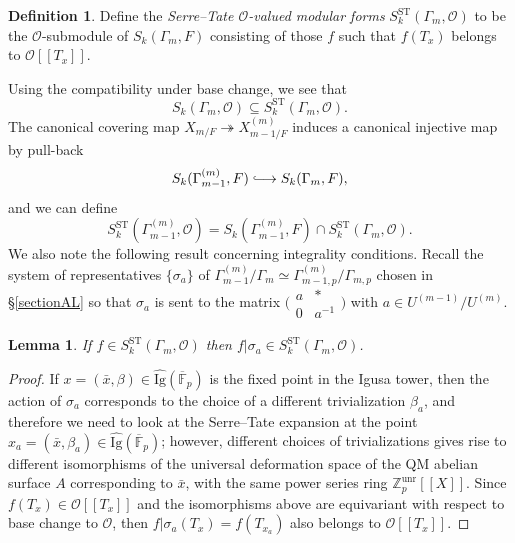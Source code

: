 \documentclass[a4paper,11pt]{amsart}
\numberwithin{equation}{section}
\theoremstyle{plain}
\newtheorem{lemma}[theorem]{Lemma}
\theoremstyle{definition}
\newtheorem{definition}[theorem]{Definition}
\theoremstyle{remark}
\newcommand{\Z}{\mathbb{Z}}
\newcommand{\F}{\mathbb{F}}
\newcommand{\pwseries}[1]{[[ #1]]}
\newcommand{\unr}{\mathrm{unr}}
\newcommand{\ST}{\mathrm{ST}}
\newcommand{\longmono}{\mbox{\;$\lhook\joinrel\longrightarrow$\;}}
\newcommand{\smallmat}[4]{\bigl(\begin{smallmatrix}#1&#2\\#3&#4\end{smallmatrix}\bigr)}
\begin{document}
\begin{definition}
Define the \emph{Serre--Tate $\mathcal{O}$-valued modular forms} $S_k^\ST(\Gamma_m,\mathcal{O})$ to be the $\mathcal{O}$-submodule of $S_k(\Gamma_m,F)$ consisting of those $f$ such that $f(T_x)$ belongs to $\mathcal{O}\pwseries{T_x}$.   
\end{definition}

Using the compatibility under base change, we see that  
\begin{equation}\label{KatzinST}
S_k(\Gamma_m,\mathcal{O})\subseteq S_k^\ST(\Gamma_m,\mathcal{O}).
\end{equation}
The canonical covering map ${X}_{m/F}\twoheadrightarrow X_{m-1/F}^{(m)}$ induces a canonical injective map by pull-back
\[S_k(\Gamma_{m-1}^{(m)},F)\longmono S_k(\Gamma_{m},F),\] and we can define 
\[S_k^\ST(\Gamma_{m-1}^{(m)},\mathcal{O})=S_k(\Gamma_{m-1}^{(m)},F)\cap S_k^\ST(\Gamma_m,\mathcal{O}).\] 
We also note the following result concerning integrality conditions. Recall the system of representatives $\{\sigma_a\}$ of $\Gamma_{m-1}^{(m)}/\Gamma_m\simeq \Gamma_{m-1,p}^{(m)}/\Gamma_{m,p}$ chosen in \S\ref{sectionAL} so that $\sigma_a$ is sent to the matrix $\smallmat a{*}0{a^{-1}}$ with $a\in U^{(m-1)}/U^{(m)}$.

\begin{lemma}\label{LemmaKatz1}
If $f\in S_k^\ST(\Gamma_m,\mathcal{O})$ then $f|\sigma_a\in S_k^\ST(\Gamma_m,\mathcal{O})$.
\end{lemma}
\begin{proof} If ${x}=(\bar{x},\beta)\in \widehat{\text{Ig}}(\overline{\F}_p)$ is the fixed point in the Igusa tower, then the action of $\sigma_a$ corresponds to the choice of a different trivialization $\beta_a$, and therefore we need to look at the Serre--Tate expansion at the point $x_a=(\bar{x},\beta_a)\in \widehat{\text{Ig}}(\overline{\F}_p)$; however, different choices of trivializations gives rise to different isomorphisms of the universal deformation space of the QM abelian surface $A$ corresponding to $\bar{x}$, with the same power series ring $\Z_p^\unr[[X]]$. Since $f(T_x)\in \mathcal{O}[[T_x]]$ and the isomorphisms above are equivariant with respect to base change to $\mathcal{O}$, then $f|\sigma_a(T_x)=f(T_{x_a})$ also belongs to $\mathcal{O}[[T_x]]$. 
\end{proof}
\end{document}
